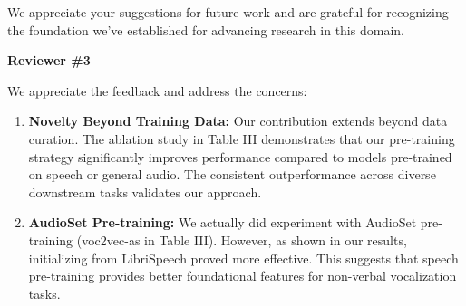\documentclass[11pt]{article}
\begin{document}
We appreciate your suggestions for future work and are grateful for recognizing the foundation we've established for advancing research in this domain.

\vspace{1mm}
\noindent\colorbox{light-blue}{\parbox{\dimexpr\linewidth-2\fboxsep}{\textbf{Reviewer \#3}}}
\noindent We appreciate the feedback and address the concerns:

\begin{enumerate}[leftmargin=*,nosep]
\item \textbf{Novelty Beyond Training Data:} Our contribution extends beyond data curation. The ablation study in Table III demonstrates that our pre-training strategy significantly improves performance compared to models pre-trained on speech or general audio. The consistent outperformance across diverse downstream tasks validates our approach.

\item \textbf{AudioSet Pre-training:} We actually did experiment with AudioSet pre-training (voc2vec-as in Table III). However, as shown in our results, initializing from LibriSpeech proved more effective. This suggests that speech pre-training provides better foundational features for non-verbal vocalization tasks.
\end{enumerate}
\end{document}
